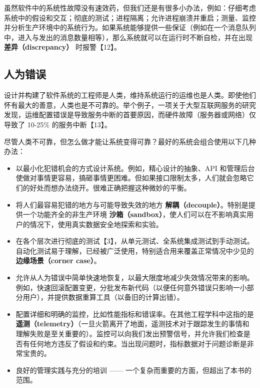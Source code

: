 虽然软件中的系统性故障没有速效药，但我们还是有很多小办法，例如：仔细考虑系统中的假设和交互；彻底的测试；进程隔离；允许进程崩溃并重启；测量、监控并分析生产环境中的系统行为。如果系统能够提供一些保证（例如在一个消息队列中，进入与发出的消息数量相等），那么系统就可以在运行时不断自检，并在出现 \textbf{差异（discrepancy）} 时报警【12】。

\subsection{人为错误}

设计并构建了软件系统的工程师是人类，维持系统运行的运维也是人类。即使他们怀有最大的善意，人类也是不可靠的。举个例子，一项关于大型互联网服务的研究发现，运维配置错误是导致服务中断的首要原因，而硬件故障（服务器或网络）仅导致了 10-25\% 的服务中断【13】。

尽管人类不可靠，但怎么做才能让系统变得可靠？最好的系统会组合使用以下几种办法：

\begin{itemize}

  \item 以最小化犯错机会的方式设计系统。例如，精心设计的抽象、API 和管理后台使做对事情更容易，搞砸事情更困难。但如果接口限制太多，人们就会忽略它们的好处而想办法绕开。很难正确把握这种微妙的平衡。

  \item 将人们最容易犯错的地方与可能导致失效的地方 \textbf{解耦（decouple）}。特别是提供一个功能齐全的非生产环境 \textbf{沙箱（sandbox）}，使人们可以在不影响真实用户的情况下，使用真实数据安全地探索和实验。

  \item 在各个层次进行彻底的测试【3】，从单元测试、全系统集成测试到手动测试。自动化测试易于理解，已经被广泛使用，特别适合用来覆盖正常情况中少见的 \textbf{边缘场景（corner case）}。

  \item 允许从人为错误中简单快速地恢复，以最大限度地减少失效情况带来的影响。例如，快速回滚配置变更，分批发布新代码（以便任何意外错误只影响一小部分用户），并提供数据重算工具（以备旧的计算出错）。

  \item 配置详细和明确的监控，比如性能指标和错误率。在其他工程学科中这指的是 \textbf{遥测（telemetry）}（一旦火箭离开了地面，遥测技术对于跟踪发生的事情和理解失败是至关重要的）。监控可以向我们发出预警信号，并允许我们检查是否有任何地方违反了假设和约束。当出现问题时，指标数据对于问题诊断是非常宝贵的。

  \item 良好的管理实践与充分的培训 —— 一个复杂而重要的方面，但超出了本书的范围。

\end{itemize}

